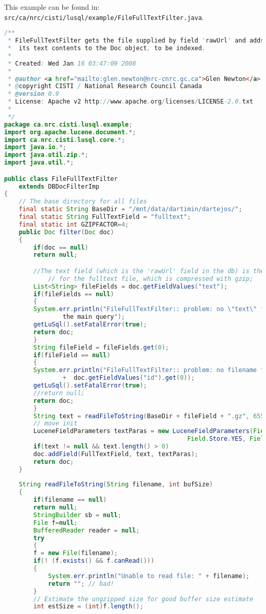 \label{filterSource}
This example can be found in: \\{\tt src/ca/nrc/cisti/lusql/example/FileFullTextFilter.java}.

\begin{lstlisting}[language=Java]
/**
 * FileFullTextFilter gets the file supplied by field 'rawUrl' and adds
 *  its text contents to the Doc object, to be indexed.
 *
 * Created: Wed Jan 16 03:47:09 2008
 *
 * @author <a href="mailto:glen.newton@nrc-cnrc.gc.ca">Glen Newton</a> CISTI Research 
 * @copyright CISTI / National Research Council Canada
 * @version 0.9
 * License: Apache v2 http://www.apache.org/licenses/LICENSE-2.0.txt
 * 
 */
package ca.nrc.cisti.lusql.example;
import org.apache.lucene.document.*;
import ca.nrc.cisti.lusql.core.*;
import java.io.*;
import java.util.zip.*;
import java.util.*;

public class FileFullTextFilter 
    extends DBDocFilterImp
{
    // The base directory for all files
    final static String BaseDir = "/mnt/data/dartimin/dartejos/";
    final static String FullTextField = "fulltext";
    final static int GZIPFACTOR=4;
    public Doc filter(Doc doc)
	{
	    if(doc == null)
		return null;

	    //The text field (which is the 'rawUrl' field in the db) is the path fragment 
            // for the fulltext file, which is compressed with gzip;
	    List<String> fileFields = doc.getFieldValues("text");
	    if(fileFields == null)
	    {
		System.err.println("FileFullTextFilter:: problem: no \"text\" field is in \
                the main query");
		getLuSql().setFatalError(true);
		return doc;
	    }
	    String fileField = fileFields.get(0);
	    if(fileField == null)
	    {
		System.err.println("FileFullTextFilter:: problem: no filename field in article id=" 
                +  doc.getFieldValues("id").get(0));
		getLuSql().setFatalError(true);
		//return null;
		return doc;
	    }
	    String text = readFileToString(BaseDir + fileField + ".gz", 65536);
	    // move init
	    LuceneFieldParameters textParas = new LuceneFieldParameters(Field.Index.TOKENIZED, 
                                                  Field.Store.YES, Field.TermVector.YES);
	    if(text != null && text.length() > 0)
		doc.addField(FullTextField, text, textParas);
	    return doc;
	}
    
    String readFileToString(String filename, int bufSize)
	{
	    if(filename == null)
		return null;
	    StringBuilder sb = null;
	    File f=null;
	    BufferedReader reader = null;
	    try
	    {
		f = new File(filename);
		if(! (f.exists() && f.canRead()))
		{
		    System.err.println("Unable to read file: " + filename);
		    return ""; // bad!
		}
		// Estimate the ungzipped size for good buffer size estimate
		int estSize = (int)f.length();


\end{lstlisting}
